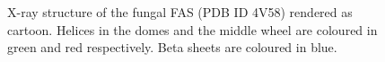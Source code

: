 			\setlength\fboxsep{5pt}
 			\setlength\fboxrule{1.5pt}
			\begin{figure} []
			\centering
			\caption[X-ray structure of the fungal FAS (PDB ID 4V58) rendered as cartoon.]{X-ray structure of the fungal FAS (PDB ID 4V58) rendered as cartoon. Helices in the domes and the middle wheel are coloured in green and red respectively. Beta sheets are coloured in blue.}
			\label{fig:fungalFasStructure}
			\end{figure}			
		
